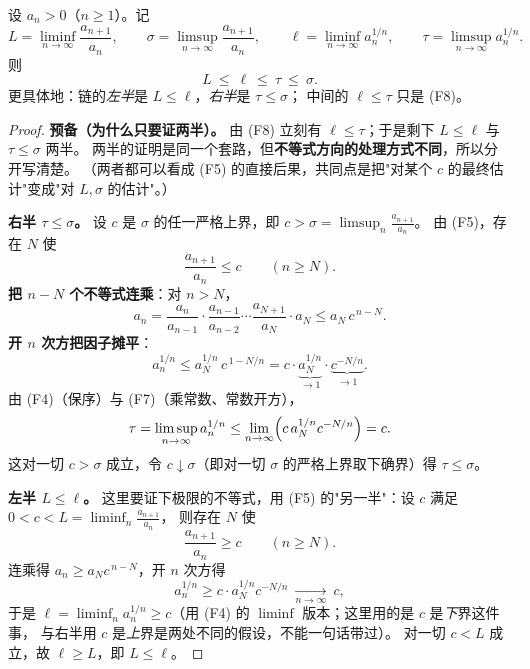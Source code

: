 \begin{proposition}[上下极限不等式链]\label{prop:limsup-chain}
设 $a_n>0$（$n\ge1$）。记
\[
L=\liminf_{n\to\infty}\frac{a_{n+1}}{a_n},\qquad
\sigma=\limsup_{n\to\infty}\frac{a_{n+1}}{a_n},\qquad
\ell=\liminf_{n\to\infty}a_n^{1/n},\qquad
\tau=\limsup_{n\to\infty}a_n^{1/n}.
\]
则
\begin{equation}\label{eq:limsup-chain}
L\ \le\ \ell\ \le\ \tau\ \le\ \sigma .
\end{equation}
更具体地：链的\emph{左半}是 $L\le\ell$，\emph{右半}是 $\tau\le\sigma$；
中间的 $\ell\le\tau$ 只是 (F8)。
\end{proposition}

\begin{proof}
\textbf{预备（为什么只要证两半）。}
由 (F8) 立刻有 $\ell\le\tau$；于是剩下 $L\le\ell$ 与 $\tau\le\sigma$ 两半。
两半的证明是同一个套路，但\textbf{不等式方向的处理方式不同}，所以分开写清楚。
（两者都可以看成 (F5) 的直接后果，共同点是把"对某个 $c$ 的最终估计"变成"对 $L,\sigma$ 的估计"。）

\medskip
\noindent\textbf{右半 $\tau\le\sigma$。}
设 $c$ 是 $\sigma$ 的任一严格上界，即 $c>\sigma=\limsup_n\frac{a_{n+1}}{a_n}$。
由 (F5)，存在 $N$ 使
\[
\frac{a_{n+1}}{a_n}\le c\qquad(n\ge N).
\]
\textbf{把 $n-N$ 个不等式连乘}：对 $n>N$，
\[
a_n=\frac{a_n}{a_{n-1}}\cdot\frac{a_{n-1}}{a_{n-2}}\cdots\frac{a_{N+1}}{a_N}\cdot a_N\le a_N\,c^{\,n-N}.
\]
\textbf{开 $n$ 次方把因子摊平}：
\[
a_n^{1/n}\le a_N^{1/n}\,c^{\,1-N/n}=c\cdot\underbrace{a_N^{1/n}}_{\to1}\cdot\underbrace{c^{-N/n}}_{\to1}.
\]
由 (F4)（保序）与 (F7)（乘常数、常数开方），
\[
\tau=\limsup_{n\to\infty}a_n^{1/n}
\le\lim_{n\to\infty}\Bigl(c\,a_N^{1/n}c^{-N/n}\Bigr)=c .
\]
这对一切 $c>\sigma$ 成立，令 $c\downarrow\sigma$（即对一切 $\sigma$ 的严格上界取下确界）得 $\tau\le\sigma$。

\medskip
\noindent\textbf{左半 $L\le\ell$。}
这里要证下极限的不等式，用 (F5) 的"另一半"：设 $c$ 满足 $0<c<L=\liminf_n\frac{a_{n+1}}{a_n}$，
则存在 $N$ 使
\[
\frac{a_{n+1}}{a_n}\ge c\qquad(n\ge N).
\]
连乘得 $a_n\ge a_Nc^{\,n-N}$，开 $n$ 次方得
\[
a_n^{1/n}\ge c\cdot a_N^{1/n}c^{-N/n}\ \xrightarrow[n\to\infty]{}\ c ,
\]
于是 $\ell=\liminf_n a_n^{1/n}\ge c$（用 (F4) 的 $\liminf$ 版本；这里用的是 $c$ 是\emph{下}界这件事，
与右半用 $c$ 是\emph{上}界是两处不同的假设，不能一句话带过）。
对一切 $c<L$ 成立，故 $\ell\ge L$，即 $L\le\ell$。
\end{proof}

